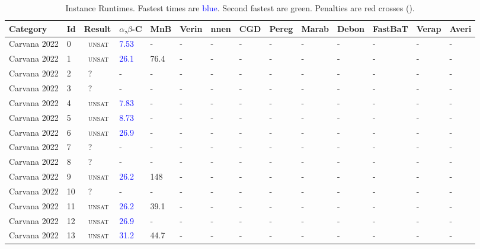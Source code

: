 

\begin{center}
{\setlength{\tabcolsep}{1pt}
\scriptsize
\begin{longtable}{@{}llllllllllllll@{}}
\caption{\footnotesize Instance Runtimes. Fastest times are \textcolor{blue}{blue}. Second fastest are \textcolor{second}{green}. Penalties are red crosses (\textbf{\textcolor{red}{}}).} \label{tab:all_results} \\
\toprule
\textbf{Category} & \textbf{Id} & \textbf{Result} & \textbf{$\alpha$,$\beta$-C} & \textbf{MnB} & \textbf{Verin} & \textbf{nnen} & \textbf{CGD} & \textbf{Pereg} & \textbf{Marab} & \textbf{Debon} & \textbf{FastBaT} & \textbf{Verap} & \textbf{Averi} \\
\midrule
\endhead
Carvana 2022 & 0 & ~\textsc{unsat} & \textcolor{blue}{7.53} & - & - & - & - & - & - & - & - & - & - \\
Carvana 2022 & 1 & ~\textsc{unsat} & \textcolor{blue}{26.1} & \textcolor{second}{76.4} & - & - & - & - & - & - & - & - & - \\
Carvana 2022 & 2 & ~? & - & - & - & - & - & - & - & - & - & - & - \\
Carvana 2022 & 3 & ~? & - & - & - & - & - & - & - & - & - & - & - \\
Carvana 2022 & 4 & ~\textsc{unsat} & \textcolor{blue}{7.83} & - & - & - & - & - & - & - & - & - & - \\
Carvana 2022 & 5 & ~\textsc{unsat} & \textcolor{blue}{8.73} & - & - & - & - & - & - & - & - & - & - \\
Carvana 2022 & 6 & ~\textsc{unsat} & \textcolor{blue}{26.9} & - & - & - & - & - & - & - & - & - & - \\
Carvana 2022 & 7 & ~? & - & - & - & - & - & - & - & - & - & - & - \\
Carvana 2022 & 8 & ~? & - & - & - & - & - & - & - & - & - & - & - \\
Carvana 2022 & 9 & ~\textsc{unsat} & \textcolor{blue}{26.2} & \textcolor{second}{148} & - & - & - & - & - & - & - & - & - \\
Carvana 2022 & 10 & ~? & - & - & - & - & - & - & - & - & - & - & - \\
Carvana 2022 & 11 & ~\textsc{unsat} & \textcolor{blue}{26.2} & \textcolor{second}{39.1} & - & - & - & - & - & - & - & - & - \\
Carvana 2022 & 12 & ~\textsc{unsat} & \textcolor{blue}{26.9} & - & - & - & - & - & - & - & - & - & - \\
Carvana 2022 & 13 & ~\textsc{unsat} & \textcolor{blue}{31.2} & \textcolor{second}{44.7} & - & - & - & - & - & - & - & - & - \\

\end{longtable}}
\end{center}
